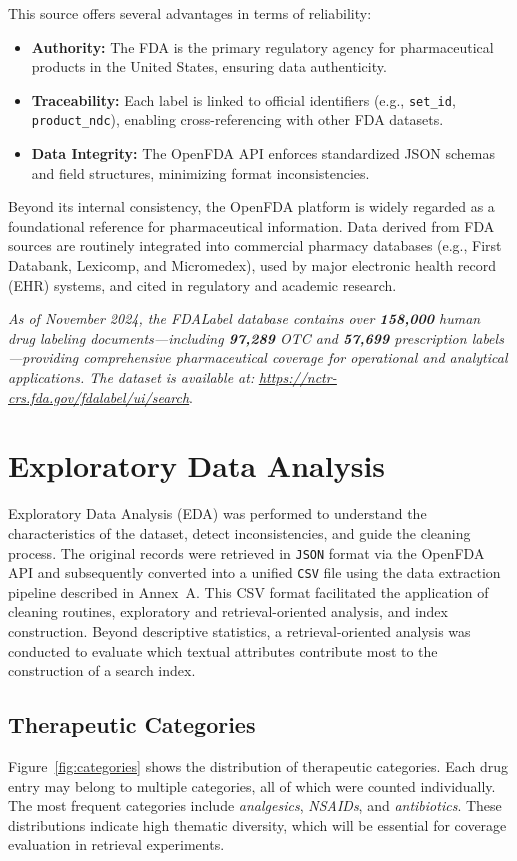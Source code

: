 This source offers several advantages in terms of reliability:

\begin{itemize}
  \item \textbf{Authority:} The FDA is the primary regulatory agency for pharmaceutical products in the United States, ensuring data authenticity.
  \item \textbf{Traceability:} Each label is linked to official identifiers (e.g., \verb|set_id|, \verb|product_ndc|), enabling cross-referencing with other FDA datasets.
  \item \textbf{Data Integrity:} The OpenFDA API enforces standardized JSON schemas and field structures, minimizing format inconsistencies.
\end{itemize}

Beyond its internal consistency, the OpenFDA platform is widely regarded as a foundational reference for pharmaceutical information. Data derived from FDA sources are routinely integrated into commercial pharmacy databases (e.g., First Databank, Lexicomp, and Micromedex), used by major electronic health record (EHR) systems, and cited in regulatory and academic research.

\textit{As of November 2024, the FDALabel database contains over \textbf{158,000} human drug labeling documents—including \textbf{97,289} OTC and \textbf{57,699} prescription labels—providing comprehensive pharmaceutical coverage for operational and analytical applications. The dataset is available at:} \underline{\textit{\url{https://nctr-crs.fda.gov/fdalabel/ui/search}}}.



\section{Exploratory Data Analysis}
Exploratory Data Analysis (EDA) was performed to understand the characteristics of the dataset, detect inconsistencies, and guide the cleaning process. The original records were retrieved in \texttt{JSON} format via the OpenFDA API and subsequently converted into a unified \texttt{CSV} file using the data extraction pipeline described in Annex~A. This CSV format facilitated the application of cleaning routines, exploratory and retrieval-oriented analysis, and index construction. Beyond descriptive statistics, a retrieval-oriented analysis was conducted to evaluate which textual attributes contribute most to the construction of a search index.


\subsection{Therapeutic Categories}
Figure~\ref{fig:categories} shows the distribution of therapeutic categories. Each drug entry may belong to multiple categories, all of which were counted individually. The most frequent categories include \textit{analgesics}, \textit{NSAIDs}, and \textit{antibiotics}. These distributions indicate high thematic diversity, which will be essential for coverage evaluation in retrieval experiments.

